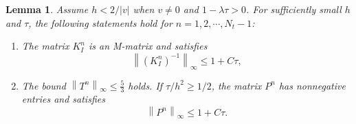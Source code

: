 \documentclass[11pt,reqno]{amsart}
\theoremstyle{plain}
\newtheorem{lemma}[theorem]{Lemma}
\theoremstyle{definition}
\numberwithin{equation}{section}
\newcommand{\abs}[1]{\left\lvert #1 \right\rvert}
\newcommand{\norm}[1]{\left\lVert #1 \right\rVert}
\begin{document}
\begin{lemma}\label{lem:KM-mat-o2}
Assume $h<2/\abs{v}$ when $v\ne0$ and $1-\lambda\tau>0$.
For sufficiently small $h$ and $\tau$, the following
statements hold for $n = 1,2,\cdots, N_t-1$:
\begin{enumerate}
    \item The matrix $K_I^n$ is an M-matrix and satisfies
\begin{equation}
    \norm{(K_I^n)^{-1}}_\infty \le 1+C\tau,
\end{equation}
    \item The bound $\norm{T^n}_\infty \le \frac{5}{3}$ holds. If $\tau / h^2 \ge 1/2$, the matrix $P^n$ has nonnegative entries and satisfies
\begin{equation}
    \norm{P^n}_\infty \le 1+C\tau.
\end{equation}
\end{enumerate}
\end{lemma}
\end{document}
